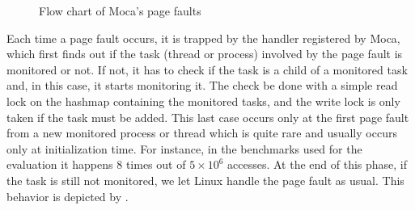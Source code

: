 
\begin{figure}[htb]
    \centering
    
    \caption{Flow chart of Moca's page faults}
    \label{fig:fpf-flow}
\end{figure}

Each time a page fault occurs, it is trapped by the handler registered by \gls{Moca}, which first finds out if the task (thread or process) involved by the page fault is monitored or not.
If not, it has to check if the task is a child of a monitored task and, in this case, it starts monitoring it.
The check be done with a simple read lock on the hashmap containing the monitored tasks, and the write lock is only taken if the task must be added.
This last case occurs only at the first page fault from a new monitored process or thread which is quite rare and usually occurs only at initialization time.
For instance, in the benchmarks used for the evaluation it happens $8$ times out of $5\times10^6$ accesses.
At the end of this phase, if the task is still not monitored, we let Linux handle the page fault as usual.
This behavior is depicted by .

